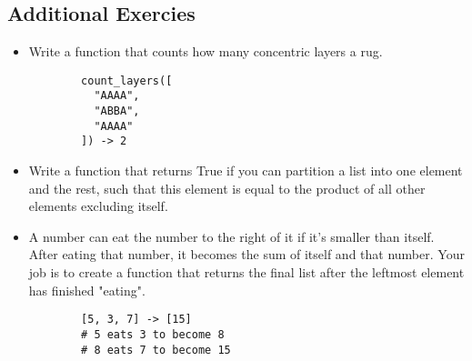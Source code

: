 \documentclass[11pt,a4paper]{article}
\begin{document}
\subsection*{Additional Exercies}
\begin{itemize}
    \item Write a function that counts how many concentric layers a rug.
    \begin{lstlisting}
        count_layers([
          "AAAA",
          "ABBA",
          "AAAA"
        ]) -> 2
    \end{lstlisting}
    \item Write a function that returns True if you can partition a list into one element and the rest, such that this element is equal to the product of all other elements excluding itself.
    \item A number can eat the number to the right of it if it's smaller than itself. After eating that number, it becomes the sum of itself and that number. Your job is to create a function that returns the final list after the leftmost element has finished "eating".
    \begin{lstlisting}
        [5, 3, 7] -> [15]
        # 5 eats 3 to become 8
        # 8 eats 7 to become 15
    \end{lstlisting}
\end{itemize}
\end{document}
